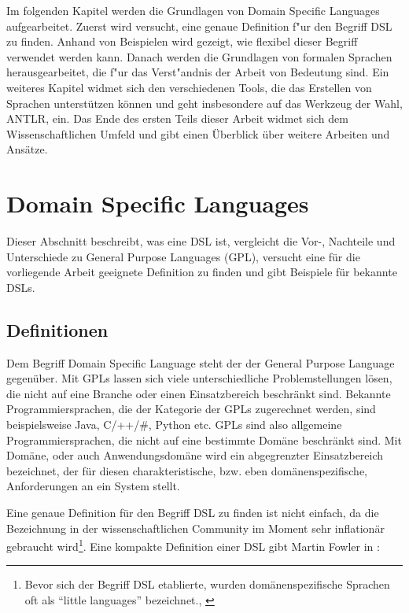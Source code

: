 Im folgenden Kapitel werden die Grundlagen von Domain Specific Languages aufgearbeitet. 
Zuerst wird versucht, eine genaue Definition f"ur den Begriff DSL zu finden. 
Anhand von Beispielen wird gezeigt, wie flexibel dieser Begriff verwendet werden kann. 
Danach werden die Grundlagen von formalen Sprachen herausgearbeitet, die f"ur das Verst"andnis der Arbeit von Bedeutung sind. 
Ein weiteres Kapitel widmet sich den verschiedenen Tools, die das Erstellen von Sprachen unterstützen können und geht insbesondere auf das Werkzeug der Wahl, ANTLR, ein.
Das Ende des ersten Teils dieser Arbeit widmet sich dem Wissenschaftlichen Umfeld und gibt einen Überblick über weitere Arbeiten und Ansätze.



\newpage

\chapter{Domain Specific Languages}
\label{chapter_dsl}

Dieser Abschnitt beschreibt, was eine DSL ist, vergleicht die Vor-, Nachteile und Unterschiede zu General Purpose Languages (GPL), versucht eine für die vorliegende Arbeit geeignete Definition zu finden und gibt Beispiele für bekannte DSLs.

\section{Definitionen}

Dem Begriff Domain Specific Language steht der der General Purpose Language gegenüber. Mit GPLs lassen sich viele unterschiedliche Problemstellungen lösen, die nicht auf eine Branche oder einen Einsatzbereich beschränkt sind. Bekannte Programmiersprachen, die der Kategorie der GPLs zugerechnet werden, sind beispielsweise Java, C/++/\#, Python etc. GPLs sind also allgemeine Programmiersprachen, die nicht auf eine bestimmte Domäne beschränkt sind. Mit Domäne, oder auch Anwendungsdomäne wird ein abgegrenzter Einsatzbereich bezeichnet, der für diesen charakteristische, bzw. eben domänenspezifische, Anforderungen an ein System stellt.

Eine genaue Definition für den Begriff DSL zu finden ist nicht einfach, da die Bezeichnung in der wissenschaftlichen Community im Moment sehr inflationär gebraucht wird\footnote{Bevor sich der Begriff DSL etablierte, wurden domänenspezifische Sprachen oft als ``little languages'' bezeichnet., \cite{VaDe00}}. Eine kompakte Definition einer DSL gibt Martin Fowler in \cite{Fowl05}:

